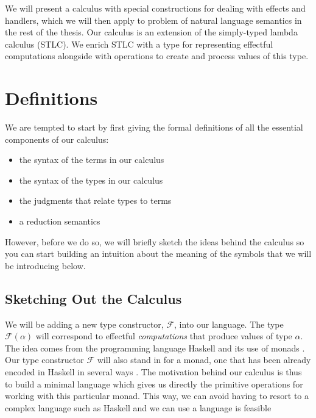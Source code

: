 We will present a calculus with special constructions for dealing with
effects and handlers, which we will then apply to problem of natural
language semantics in the rest of the thesis. Our calculus is an extension
of the simply-typed lambda calculus (STLC). We enrich STLC with a type for
representing effectful computations alongside with operations to create and
process values of this type.

\chapter{Definitions}

We are tempted to start by first giving the formal definitions of all the
essential components of our calculus:

\begin{itemize}
\item the syntax of the terms in our calculus
\item the syntax of the types in our calculus
\item the judgments that relate types to terms
\item a reduction semantics
\end{itemize}

However, before we do so, we will briefly sketch the ideas behind the
calculus so you can start building an intuition about the meaning of the
symbols that we will be introducing below.

\section{Sketching Out the Calculus}

We will be adding a new type constructor, $\mathcal{F}$, into our
language. The type $\mathcal{F}(\alpha)$ will correspond to effectful
\emph{computations} that produce values of type $\alpha$. The idea comes
from the programming language Haskell and its use of monads
\cite{moggi1991notions,wadler1992essence,jones2003haskell}. Our type
constructor $\mathcal{F}$ will also stand in for a monad, one that has been
already encoded in Haskell in several ways
\cite{kiselyov2013extensible,kammar2013handlers}. The motivation behind our
calculus is thus to build a minimal language which gives us directly the
primitive operations for working with this particular monad. This way, we
can avoid having to resort to a complex language such as Haskell and we can
use a language is feasible

